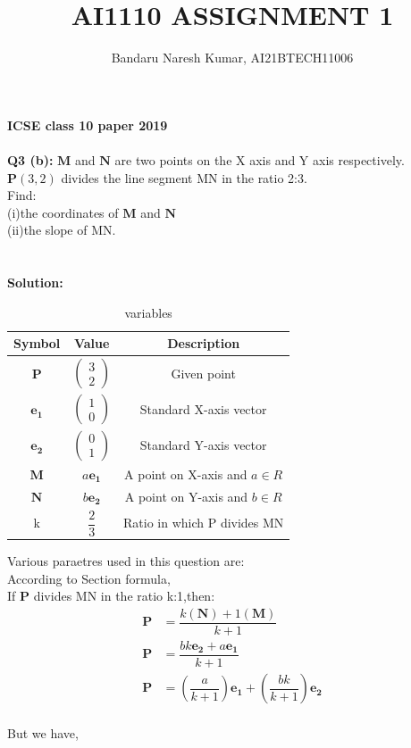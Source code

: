 \documentclass[journal,12pt,twocolumn]{IEEEtran}
\title{AI1110 ASSIGNMENT 1}
\author{Bandaru Naresh Kumar, AI21BTECH11006}
\theoremstyle{remark}
\newcommand{\myvec}[1]{\ensuremath{\begin{pmatrix}#1\end{pmatrix}}}
\numberwithin{equation}{subsection}
\let\vec\mathbf
\begin{document}
\maketitle
\textbf{ICSE class 10 paper 2019}\\\\
\textbf{Q3 (b):}
$\vec{M}$ and $\vec{N}$ are two points on the X axis and Y axis respectively.
$\vec{P}(3,2)$ divides the line segment MN in the ratio 2:3.\\
Find:\\
 (i)the coordinates of $\vec{M}$ and $\vec{N}$\\
 (ii)the slope of MN.\\\\
\\\textbf{Solution:}\\
\begin{table}[ht]
\centering
\begin{tabular}{|c|c|c|}
\hline
Symbol & Value & Description\\
\hline
\hline
$\vec{P}$ & $\myvec{3\\2}$ & Given point\\
\hline
$\vec{e_1}$ & $\myvec{1\\0}$ & Standard X-axis vector\\
\hline
$\vec{e_2}$ & $\myvec{0\\1}$ & Standard Y-axis vector\\
\hline
$\vec{M}$ & $a\vec{e_1}$ & A point on X-axis and $a\in R$\\
\hline
$\vec{N}$ & $b\vec{e_2}$ & A point on Y-axis and $b\in R$\\
\hline
k & $\dfrac{2}{3}$ & Ratio in which P divides MN\\
\hline
\end{tabular}
\caption{variables}
\label{tab:variables}
\end{table}
Various paraetres used in this question are:\\
According to Section formula,\\
If $\vec{P}$ divides MN in the ratio k:1,then:
\begin{align}
   \vec{P} &= \dfrac{k(\vec{N})+1(\vec{M})}{k+1}\\
   \vec{P} &= \dfrac{bk\vec{e_2}+a\vec{e_1}}{k+1}\\
   \vec{P} &= \left( \dfrac{a}{k+1}\right) \vec{e_1}+\left( \dfrac{bk}{k+1}\right) \vec{e_2}
\end{align}\\
But we have,\\
\end{document}
